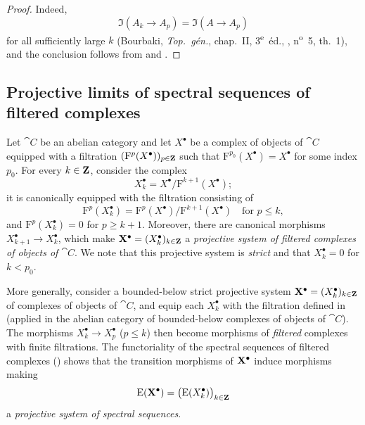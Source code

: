 \begin{proof}
Indeed,
\[
  \Im(A_k\longrightarrow A_p)
  =
  \Im(A\longrightarrow A_p)
\]
for all sufficiently large $k$
(Bourbaki, \emph{Top.\ g\'{e}n.}, chap.~II,
3\textsuperscript{e}~\'{e}d., ,
n\textsuperscript{o}~5, th.~1), and the conclusion follows from
 and .
\end{proof}

\subsection{Projective limits of spectral sequences of filtered complexes}
\label{subsection:0.13.5}

\begin{env}[13.5.1]
\label{0.13.5.1}
Let $\cat{C}$ be an abelian category and let $X^\bullet$ be a complex
of objects of $\cat{C}$ equipped with a filtration
$(\mathrm{F}^p(X^\bullet))_{p\in\mathbf{Z}}$ such that
$\mathrm{F}^{p_0}(X^\bullet)=X^\bullet$ for some index $p_0$.
For every $k\in\mathbf{Z}$, consider the complex
\[
  X^\bullet_k=X^\bullet/\mathrm{F}^{k+1}(X^\bullet);
\]
it is canonically equipped with the filtration consisting of
\[
  \mathrm{F}^p(X^\bullet_k)
  =
  \mathrm{F}^p(X^\bullet)/\mathrm{F}^{k+1}(X^\bullet)
  \quad\text{for }p\leq k,
\]
and $\mathrm{F}^p(X^\bullet_k)=0$ for $p\geq k+1$.
Moreover, there are canonical morphisms
$X^\bullet_{k+1}\longrightarrow X^\bullet_k$, which make
$\mathbf{X}^\bullet=(X^\bullet_k)_{k\in\mathbf{Z}}$ a \emph{projective system
of filtered complexes of objects of $\cat{C}$}.
We note that this projective system is \emph{strict} and that
$X^\bullet_k=0$ for $k<p_0$.
\end{env}

\begin{env}[13.5.2]
\label{0.13.5.2}
More generally, consider a bounded-below strict projective system
$\mathbf{X}^\bullet=(X^\bullet_k)_{k\in\mathbf{Z}}$ of complexes of objects of
$\cat{C}$, and equip each $X^\bullet_k$ with the filtration defined in
 (applied in the abelian category of bounded-below
complexes of objects of $\cat{C}$).
The morphisms
$X^\bullet_k\longrightarrow X^\bullet_p$ ($p\leq k$) then become
morphisms of \emph{filtered} complexes with finite filtrations.
The functoriality of the spectral sequences of filtered complexes
() shows that the transition morphisms of
$\mathbf{X}^\bullet$ induce morphisms making
\[
  \mathrm{E}(\mathbf{X}^\bullet)
  =
  \bigl(\mathrm{E}(X^\bullet_k)\bigr)_{k\in\mathbf{Z}}
\]
a \emph{projective system of spectral sequences}.
\end{env}

